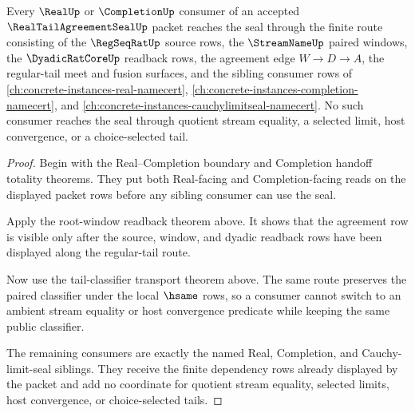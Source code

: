 \begin{theorem}
\label{thm:realtailagreementseal-completion-consumer-scope}
Every $\RealUp$ or $\CompletionUp$ consumer of an accepted $\RealTailAgreementSealUp$ packet reaches the seal through the finite route consisting of the $\RegSeqRatUp$ source rows, the $\StreamNameUp$ paired windows, the $\DyadicRatCoreUp$ readback rows, the agreement edge $W \to D \to A$, the regular-tail meet and fusion surfaces, and the sibling consumer rows of \autoref{ch:concrete-instances-real-namecert}, \autoref{ch:concrete-instances-completion-namecert}, and \autoref{ch:concrete-instances-cauchylimitseal-namecert}. No such consumer reaches the seal through quotient stream equality, a selected limit, host convergence, or a choice-selected tail.
\end{theorem}
\begin{proof}
Begin with the Real--Completion boundary and Completion handoff totality theorems. They put both Real-facing and Completion-facing reads on the displayed packet rows before any sibling consumer can use the seal.

Apply the root-window readback theorem above. It shows that the agreement row is visible only after the source, window, and dyadic readback rows have been displayed along the regular-tail route.

Now use the tail-classifier transport theorem above. The same route preserves the paired classifier under the local $\hsame$ rows, so a consumer cannot switch to an ambient stream equality or host convergence predicate while keeping the same public classifier.

The remaining consumers are exactly the named Real, Completion, and Cauchy-limit-seal siblings. They receive the finite dependency rows already displayed by the packet and add no coordinate for quotient stream equality, selected limits, host convergence, or choice-selected tails.
\end{proof}







